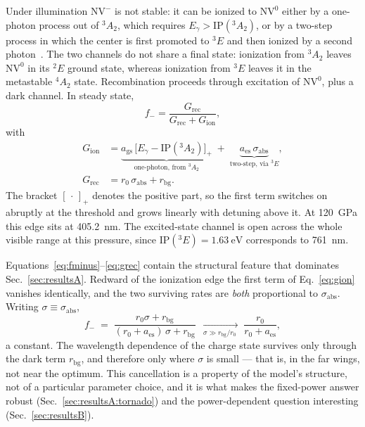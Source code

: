 \documentclass[preprint,12pt]{elsarticle}
\newcommand{\NVm}{\ensuremath{\mathrm{NV}^{-}}}
\newcommand{\NVz}{\ensuremath{\mathrm{NV}^{0}}}
\newcommand{\gsA}{\ensuremath{^{3}\!A_{2}}}
\newcommand{\esE}{\ensuremath{^{3}\!E}}
\newcommand{\sabs}{\ensuremath{\sigma_{\mathrm{abs}}}}
\newcommand{\fm}{\ensuremath{f_{-}}}
\begin{document}
Under illumination \NVm{} is not stable: it can be ionized to \NVz{} either by a
one-photon process out of \gsA{}, which requires $E_\gamma > \mathrm{IP}(\gsA)$,
or by a two-step process in which the center is first promoted to \esE{} and then
ionized by a second photon~\cite{Aslam2013,Razinkovas2021}. The two channels do
not share a final state: ionization from \gsA{} leaves \NVz{} in its $^{2}E$
ground state, whereas ionization from \esE{} leaves it in the metastable
$^{4}\!A_{2}$ state. Recombination
proceeds through excitation of \NVz{}, plus a dark channel. In steady state,
\begin{equation}
  \fm = \frac{G_{\mathrm{rec}}}{G_{\mathrm{rec}} + G_{\mathrm{ion}}},
  \label{eq:fminus}
\end{equation}
with
\begin{align}
  G_{\mathrm{ion}} &= \underbrace{a_{\mathrm{gs}}\,
      \big[E_\gamma - \mathrm{IP}(\gsA)\big]_{+}}_{\text{one-photon, from }\gsA}
    \;+\; \underbrace{a_{\mathrm{es}}\,\sabs}_{\text{two-step, via }\esE} ,
  \label{eq:gion}\\
  G_{\mathrm{rec}} &= r_0\,\sabs + r_{\mathrm{bg}} .
  \label{eq:grec}
\end{align}
The bracket $[\,\cdot\,]_{+}$ denotes the positive part, so the first term
switches on abruptly at the threshold and grows linearly with detuning above it.
At \SI{120}{\giga\pascal} this edge sits at \SI{405.2}{\nano\meter}. The
excited-state channel is open across the whole visible range at this pressure,
since $\mathrm{IP}(\esE) = \SI{1.63}{\electronvolt}$ corresponds to
\SI{761}{\nano\meter}.

Equations~\eqref{eq:fminus}--\eqref{eq:grec} contain the structural feature that
dominates Sec.~\ref{sec:resultsA}. Redward of the ionization edge the first term
of Eq.~\eqref{eq:gion} vanishes identically, and the two surviving rates are
\emph{both} proportional to $\sabs$. Writing $\sigma \equiv \sabs$,
\begin{equation}
  \fm \;=\; \frac{r_0\sigma + r_{\mathrm{bg}}}
                 {(r_0 + a_{\mathrm{es}})\,\sigma + r_{\mathrm{bg}}}
  \;\xrightarrow[\;\sigma \gg r_{\mathrm{bg}}/r_0\;]{}\;
  \frac{r_0}{r_0 + a_{\mathrm{es}}} ,
  \label{eq:fminus-limit}
\end{equation}
a constant. The wavelength dependence of the charge state survives only through
the dark term $r_{\mathrm{bg}}$, and therefore only where $\sigma$ is small ---
that is, in the far wings, not near the optimum. This cancellation is a property
of the model's structure, not of a particular parameter choice, and it is what
makes the fixed-power answer robust (Sec.~\ref{sec:resultsA:tornado}) and the
power-dependent question interesting (Sec.~\ref{sec:resultsB}).
\end{document}
